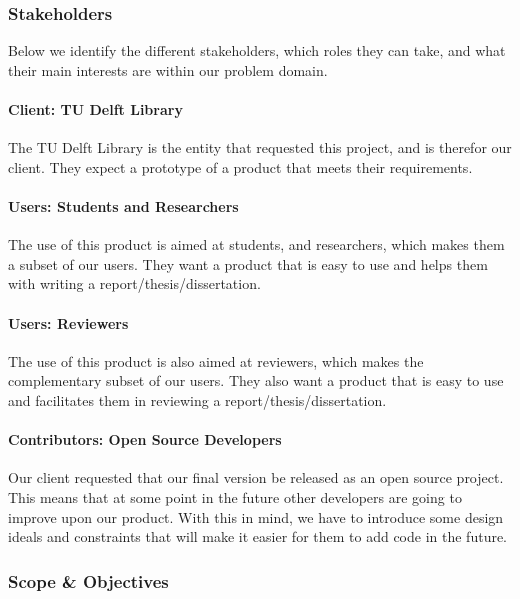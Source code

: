 \subsubsection{Stakeholders} %

Below we identify the different stakeholders, which roles they can take, and what their main interests are within our problem domain.

\paragraph{Client: TU Delft Library} The TU Delft Library is the entity that requested this project, and is therefor our client. They expect a prototype of a product that meets their requirements.

\paragraph{Users: Students and Researchers} The use of this product is aimed at students, and researchers, which makes them a subset of our users. They want a product that is easy to use and helps them with writing a report/thesis/dissertation.

\paragraph{Users: Reviewers} The use of this product is also aimed at reviewers, which makes the complementary subset of our users. They also want a product that is easy to use and facilitates them in reviewing a report/thesis/dissertation.

\paragraph{Contributors: Open Source Developers} Our client requested that our final version be released as an open source project. This means that at some point in the future other developers are going to improve upon our product. With this in mind, we have to introduce some design ideals and constraints that will make it easier for them to add code in the future.

\subsubsection{Scope \& Objectives}

